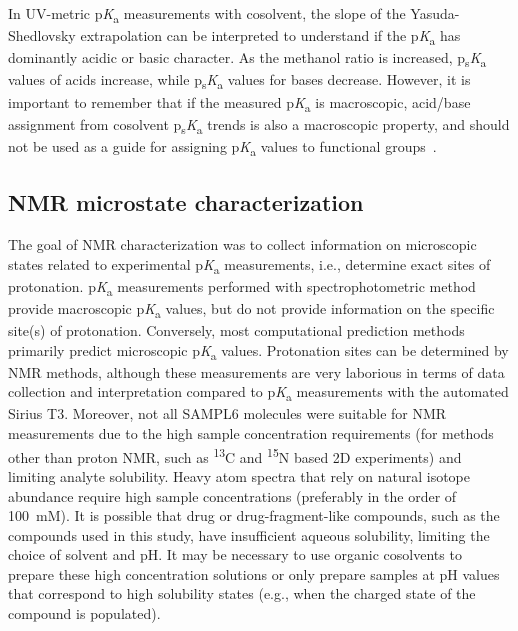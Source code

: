 \documentclass[9pt,lineno]{elife}
\newcommand{\pKa}{p\textit{K}\textsubscript{a}}
\newcommand{\psKa}{p\textsubscript{s}\textit{K}\textsubscript{a}}
\begin{document}
In UV-metric \pKa{} measurements with cosolvent, the slope of the Yasuda-Shedlovsky extrapolation can be interpreted to understand if the \pKa{} has dominantly acidic or basic character. 
As the methanol ratio is increased, \psKa{} values of acids increase, while \psKa{} values for bases decrease. 
However, it is important to remember that if the measured \pKa{} is macroscopic, acid/base assignment from cosolvent \psKa{} trends is also a macroscopic property, and should not be used as a guide for assigning \pKa{} values to functional groups~\citep{fraczkiewicz_silico_2013}.

\subsection{NMR microstate characterization}

The goal of NMR characterization was to collect information on microscopic states related to experimental \pKa{} measurements, i.e., determine exact sites of protonation. 
\pKa{} measurements performed with spectrophotometric method provide macroscopic \pKa{} values, but do not provide information on the specific site(s) of protonation. 
Conversely, most computational prediction methods primarily predict microscopic \pKa{} values. 
Protonation sites can be determined by NMR methods, although these measurements are very laborious in terms of data collection and interpretation compared to \pKa{} measurements with the automated Sirius T3. 
Moreover, not all SAMPL6 molecules were suitable for NMR measurements due to the high sample concentration requirements (for methods other than proton NMR, such as \textsuperscript{13}C and \textsuperscript{15}N based 2D experiments) and limiting analyte solubility. 
Heavy atom spectra that rely on natural isotope abundance require high sample concentrations (preferably in the order of 100~mM). It is possible that drug or drug-fragment-like compounds, such as the compounds used in this study, have insufficient aqueous solubility, limiting the choice of solvent and pH. 
It may be necessary to use organic cosolvents to prepare these high concentration solutions or only prepare samples at pH values that correspond to high solubility states (e.g., when the charged state of the compound is populated). 
\end{document}
